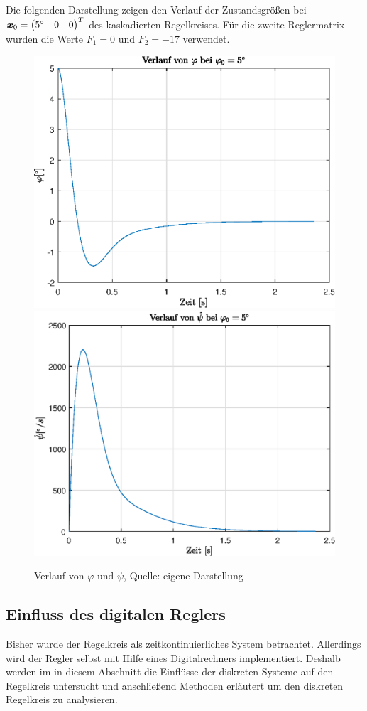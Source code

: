 Die folgenden Darstellung zeigen den Verlauf der Zustandsgrößen bei $\boldsymbol{x}_0=\begin{pmatrix}
5^\circ & 0 & 0
\end{pmatrix}^T$ des kaskadierten Regelkreises. Für die zweite Reglermatrix wurden die Werte $F_1=0$ und $F_2=-17$ verwendet.
\begin{figure}[!h]
\centering
\includegraphics[width=0.45\linewidth]{4_Regelungstechnik/img/x0_phi_kaskadiert}
\includegraphics[width=0.45\linewidth]{4_Regelungstechnik/img/x0_psi__d_kaskadiert}
\caption{Verlauf von $\varphi$ und $\dot{\psi}$, Quelle: eigene Darstellung}
\end{figure}

\subsection{Einfluss des digitalen Reglers}
Bisher wurde der Regelkreis als zeitkontinuierliches System betrachtet. Allerdings wird der Regler selbst mit Hilfe eines Digitalrechners implementiert. Deshalb werden im in diesem Abschnitt die Einflüsse der diskreten Systeme auf den Regelkreis untersucht und anschließend Methoden erläutert um den diskreten Regelkreis zu analysieren.

